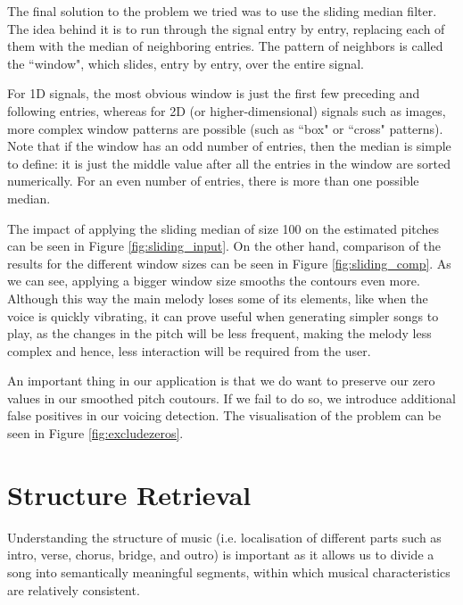 The final solution to the problem we tried was to use the sliding median filter. The idea behind it is to run through the signal entry by entry, replacing each of them with the median of neighboring entries. The pattern of neighbors is called the ``window", which slides, entry by entry, over the entire signal. 

For 1D signals, the most obvious window is just the first few preceding and following entries, whereas for 2D (or higher-dimensional) signals such as images, more complex window patterns are possible (such as ``box" or ``cross" patterns). Note that if the window has an odd number of entries, then the median is simple to define: it is just the middle value after all the entries in the window are sorted numerically. For an even number of entries, there is more than one possible median.

The impact of applying the sliding median of size 100 on the estimated pitches can be seen in Figure \ref{fig:sliding_input}. On the other hand, comparison of the results for the different window sizes can be seen in Figure \ref{fig:sliding_comp}. As we can see, applying a bigger window size smooths the contours even more. Although this way the main melody loses some of its elements, like when the voice is quickly vibrating, it can prove useful when generating simpler songs to play, as the changes in the pitch will be less frequent, making the melody less complex and hence, less interaction will be required from the user. 

An important thing in our application is that we do want to preserve our zero values in our smoothed pitch coutours. If we fail to do so, we introduce additional false positives in our voicing detection. The visualisation of the problem can be seen in Figure \ref{fig:excludezeros}.

\vspace{20pt}


\section{Structure Retrieval}

Understanding the structure of music (i.e. localisation of different parts such as intro, verse, chorus, bridge, and outro) is important as it allows us to divide a song into semantically meaningful segments, within which musical characteristics are relatively consistent.

\vspace{10pt}

